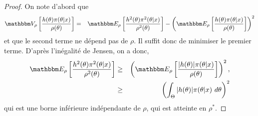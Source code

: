 \begin{proof}%
On note d'abord que
\begin{eqnarray*}
\V_{\rho}\left[\frac{h(\theta)\pi(\theta|x)}{\rho(\theta)}\right] & = & \E_{\rho}\left[\frac{h^2(\theta)\pi^2(\theta|x)}{\rho^2(\theta)}\right]-  \left(\E_{\rho}\left[\frac{h(\theta)\pi(\theta|x)}{\rho(\theta)}\right]\right)^2
\end{eqnarray*}
et que le second terme ne dépend pas de $\rho$. Il suffit donc de minimiser le premier terme. D'après l'inégalité de Jensen,  on a donc,
\begin{eqnarray*}
\E_{\rho}\left[\frac{h^2(\theta)\pi^2(\theta|x)}{\rho^2(\theta)}\right] & \geq & \left(\E_{\rho}\left[\frac{|h(\theta)|\pi(\theta|x)}{\rho(\theta)}\right]\right)^2, \\
& \geq & \left(\int_{\Theta} |h(\theta)|\pi(\theta|x) \ d\theta\right)^2
\end{eqnarray*}
qui est une borne inférieure indépendante de $\rho$, qui est atteinte en $\rho^*$.
\end{proof}